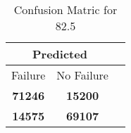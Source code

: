 \begin{table}[] 
\label{Table: Prediction Accuracy-DMD82.5OnlySunEKF-ignoreReflection-Reflection} 
\caption{Confusion Matric for 82.5} 
\centering 
\begin{tabular} 
 {@{}ccc@{}} 
\toprule 
\multicolumn{2}{c}{\textbf{Predicted}}
 \\ \midrule 
\multicolumn{1}{|c|}{Failure} & 
\multicolumn{1}{c|}{No Failure}
 \\ \midrule 
\multicolumn{1}{|c|}{\color{green}\textbf{71246}} & 
\multicolumn{1}{c|}{\color{red}\textbf{15200}}
 \\ \midrule 
\multicolumn{1}{|c|}{\color{red}\textbf{14575}} & 
\multicolumn{1}{c|}{\color{green}\textbf{69107}}
 \\ \bottomrule 
\end{tabular} 
\end{table} 
